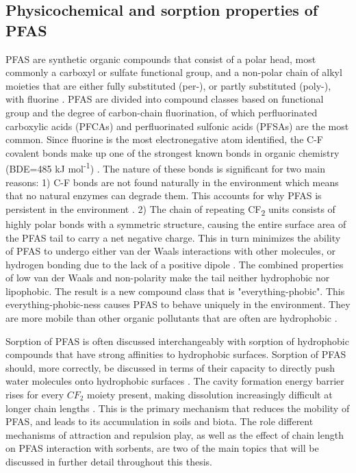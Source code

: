 \subsection{Physicochemical and sorption properties of PFAS}\label{sec:physchem} 
PFAS are synthetic organic compounds that consist of a polar head, most commonly a carboxyl or sulfate functional group, and a non-polar chain of alkyl moieties that are either fully substituted (per-), or partly substituted (poly-), with fluorine \citep{wang2011physchem}. PFAS are divided into compound classes based on functional group and the degree of carbon-chain fluorination, of which perfluorinated carboxylic acids (\acrshort{PFCA}s) and perfluorinated sulfonic acids (PFSAs) are the most common. Since fluorine is the most electronegative atom identified, the C-F covalent bonds make up one of the strongest known bonds in organic chemistry (BDE=485 kJ mol\textsuperscript{-1}) \citep{Lau2007}. The nature of these bonds is significant for two main reasons: 1) C-F bonds are not found naturally in the environment which means that no natural enzymes can degrade them. This accounts for why PFAS is persistent in the environment \citep{hale2020persistent,krafft2015per}. 2) The chain of repeating CF\textsubscript{2} units consists of highly polar bonds with a symmetric structure, causing the entire surface area of the PFAS tail to carry a net negative charge. This in turn minimizes the ability of PFAS to undergo either van der Waals interactions with other molecules, or hydrogen bonding due to the lack of a positive dipole \citep{Arp2006}. The combined properties of low van der Waals and non-polarity make the tail neither hydrophobic nor lipophobic. The result is a new compound class that is "everything-phobic". This everything-phobic-ness causes \acrshort{PFAS} to behave uniquely in the environment. They are more mobile than other organic pollutants that are often are hydrophobic \citep{hale2020persistent}. 

Sorption of PFAS is often discussed interchangeably with sorption of hydrophobic compounds that have strong affinities to hydrophobic surfaces. Sorption of PFAS should, more correctly, be discussed in terms of their capacity to directly push water molecules onto hydrophobic surfaces \citep{Arp2006}. The cavity formation energy barrier rises for every $CF_2$ moiety present, making dissolution increasingly difficult at longer chain lengths \citep{bhhatarai2011,Arp2006}. This is the primary mechanism that reduces the mobility of PFAS, and leads to its accumulation in soils and biota. The role different mechanisms of attraction and repulsion play, as well as the effect of chain length on PFAS interaction with sorbents, are two of the main topics that will be discussed in further detail throughout this thesis. 

